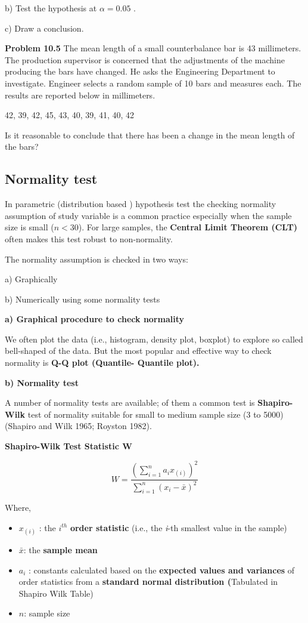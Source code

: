 \documentclass[
  11pt,
  letterpaper,
  DIV=11,
  numbers=noendperiod]{scrreprt}
\begin{document}
b) Test the hypothesis at \(\alpha=0.05\) .

c) Draw a conclusion.

\textbf{Problem 10.5} The mean length of a small counterbalance bar is
43 millimeters. The production supervisor is concerned that the
adjustments of the machine producing the bars have changed. He asks the
Engineering Department to investigate. Engineer selects a random sample
of 10 bars and measures each. The results are reported below in
millimeters.

42, 39, 42, 45, 43, 40, 39, 41, 40, 42

Is it reasonable to conclude that there has been a change in the mean
length of the bars?

\subsection{Normality test}\label{normality-test}

In parametric (distribution based ) hypothesis test the checking
normality assumption of study variable is a common practice especially
when the sample size is small (\(n<30\)). For large samples, the
\textbf{Central Limit Theorem (CLT)} often makes this test robust to
non-normality.

The normality assumption is checked in two ways:

a) Graphically

b) Numerically using some normality tests

\textbf{a) Graphical procedure to check normality}

We often plot the data (i.e., histogram, density plot, boxplot) to
explore so called bell-shaped of the data. But the most popular and
effective way to check normality is \textbf{Q-Q plot (Quantile- Quantile
plot).}

\textbf{b) Normality test}

A number of normality tests are available; of them a common test is
\textbf{Shapiro-Wilk} test of normality suitable for small to medium
sample size (3 to 5000) (Shapiro and Wilk 1965; Royston 1982).

\textbf{Shapiro-Wilk Test Statistic W}

\[W=\frac{(\sum_{i=1}^n a_i x_{(i)})^2}{\sum_{i=1}^n (x_i-\bar x)^2}\]

Where,

\begin{itemize}
\item
  \(x_{(i)}\) : the \(i^{th}\) \textbf{order statistic} (i.e., the
  \emph{i}-th smallest value in the sample)
\item
  \(\bar x\): the \textbf{sample mean}
\item
  \(a_i\) : constants calculated based on the \textbf{expected values
  and variances} of order statistics from a \textbf{standard normal
  distribution (}Tabulated in Shapiro Wilk Table)
\item
  \(n\): sample size
\end{itemize}
\end{document}
